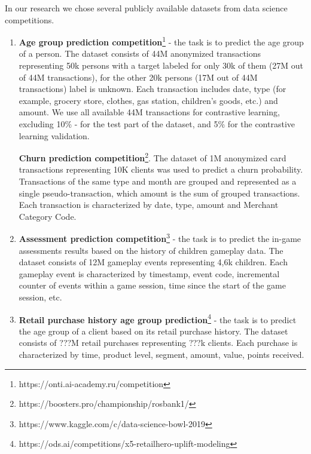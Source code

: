 \documentclass{article}
\begin{document}
In our research we chose several publicly available datasets from data science competitions.
\begin{enumerate}
    \item \textbf{Age group prediction competition}\footnote{https://onti.ai-academy.ru/competition} - the task is to predict the age group of a person. The dataset consists of 44M anonymized transactions representing 50k persons with a target labeled for only 30k of them (27M out of 44M transactions), for the other 20k persons (17M out of 44M transactions) label is unknown. Each transaction includes date, type (for example, grocery store, clothes, gas station, children's goods, etc.) and amount. We use all available 44M transactions for contrastive learning, excluding 10\% - for the test part of the dataset, and  5\% for the contrastive learning validation.
        
    
    \textbf{Churn prediction competition}\footnote{https://boosters.pro/championship/rosbank1/}. The dataset of 1M anonymized card transactions representing 10K clients was used to predict a churn probability. Transactions of the same type and month are grouped and represented as a single pseudo-transaction, which amount is the sum of grouped transactions. Each transaction is characterized by date, type, amount and Merchant Category Code.
    
    \item \textbf{Assessment prediction competition}\footnote{https://www.kaggle.com/c/data-science-bowl-2019} - the task is to predict the in-game assessments results based on the history of children gameplay data. The dataset consists of 12M gameplay events representing 4,6k children. Each gameplay event is characterized by timestamp, event code, incremental counter of events within a game session, time since the start of the game session, etc.
    
    \item \textbf{Retail purchase history age group prediction}\footnote{https://ods.ai/competitions/x5-retailhero-uplift-modeling} - the task is to predict the age group of a client based on its retail purchase history. The dataset consists of ???M retail purchases representing ???k clients. Each purchase is characterized by time, product level, segment, amount, value, points received.

\end{enumerate}
\end{document}
